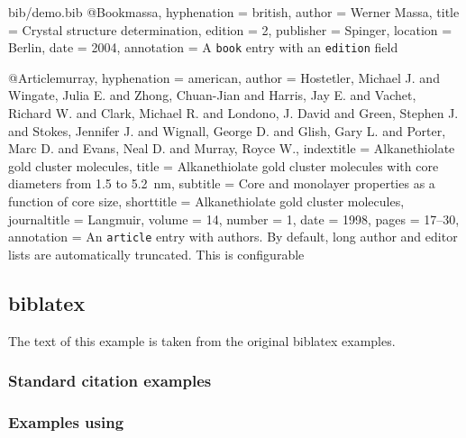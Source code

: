 \begin{filecontents*}{bib/demo.bib}
@Book{massa,
  hyphenation = {british},
  author	  = {Werner Massa},
  title		  = {Crystal structure determination},
  edition	  = {2},
  publisher	  = {Spinger},
  location	  = {Berlin},
  date		  = {2004},
  annotation  = {A \texttt{book} entry with an \texttt{edition} field}
}

@Article{murray,
  hyphenation  = {american},
  author	  = {Hostetler, Michael J. and Wingate, Julia E. and Zhong,
    Chuan-Jian and Harris, Jay E. and Vachet, Richard W. and Clark, Michael R.
    and Londono, J. David and Green, Stephen J. and Stokes, Jennifer J. and
    Wignall, George D. and Glish, Gary L. and Porter, Marc D. and Evans, Neal
    D. and Murray, Royce W.},
  indextitle  = {Alkanethiolate gold cluster molecules},
  title		  = {Alkanethiolate gold cluster molecules with core diameters from 1.5 to 5.2~nm},
  subtitle	  = {Core and monolayer properties as a function of core size},
  shorttitle  = {Alkanethiolate gold cluster molecules},
  journaltitle	= {Langmuir},
  volume	  = {14},
  number	  = {1},
  date		  = {1998},
  pages		  = {17--30},
  annotation  = {An \texttt{article} entry with  authors. By
    default, long author and editor lists are automatically truncated. This is
    configurable}
}
\end{filecontents*}

\subsection{biblatex}
\label{sec:demo:biblatex}
The text of this example is taken from the original biblatex examples.

\subsubsection{Standard citation examples}

\begin{filecontents*}{\democodefile}
\cite{companion}
\cite[59]{companion}
\cite[see][]{companion}
\cite[see][59--63]{companion}
\end{filecontents*}

%


\subsubsection{Examples using }

